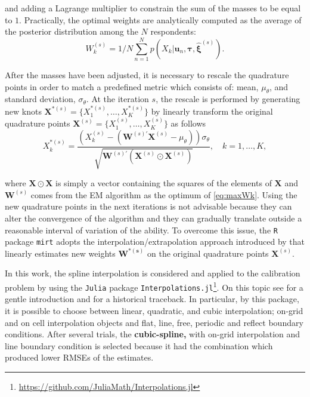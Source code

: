 \noindent and adding a Lagrange multiplier to constrain the sum of the masses to be equal to $1$. 
Practically, the optimal weights are analytically computed as the average of the posterior distribution among the $N$ respondents: 
\begin{equation} \label{eq:updateWk}
W_k^{(s)}  = 1/N \sum_{n=1}^N{p(X_k|\mathbf{u}_n,\boldsymbol{\tau},\hat{\boldsymbol{\xi}}^{(s)})}.
\end{equation}

After the masses have been adjusted, it is necessary to rescale the quadrature points in order to match a predefined metric which consists of: mean, $\mu_\theta$, and standard deviation, $\sigma_\theta$. At the iteration $s$, the rescale is performed by generating new knots $\boldsymbol{X}^{*(s)}=\{X_1^{*(s)},\ldots,X_K^{*(s)}\}$ by linearly transform the original quadrature points $\boldsymbol{X}^{(s)}=\{X_1^{(s)},\ldots,X_K^{(s)}\}$ as follows
\begin{equation}\label{eq:rescale}
X_k^{*(s)}=\frac{(X_k^{(s)}-(\boldsymbol{W}^{(s)'}\boldsymbol{X}^{(s)}-\mu_\theta))\sigma_\theta}{\sqrt{\boldsymbol{W}^{(s)'}(\boldsymbol{X}^{(s)}\odot \boldsymbol{X}^{(s)})}}, \quad  k=1,\ldots,K,
\end{equation}

\noindent where $\boldsymbol{X} \odot \boldsymbol{X}$ is simply a vector containing the squares of the elements of $\boldsymbol{X}$ and $\boldsymbol{W}^{(s)}$ comes from the EM algorithm as the optimum of \eqref{eq:maxWk}.
Using the new quadrature points in the next iterations is not advisable because they can alter the convergence of the algorithm and they can gradually translate outside a reasonable interval of variation of the ability. To overcome this issue, the \texttt{R} package \texttt{mirt} adopts the interpolation/extrapolation approach introduced by \textcite{woods2007} that linearly estimates new weights $\boldsymbol{W^{*(s)}}$ on the original quadrature points $\boldsymbol{X}^{(s)}$. 

In this work, the spline interpolation is considered and applied to the calibration problem by using the \texttt{Julia} package \texttt{Interpolations.jl}\footnote{\url{https://github.com/JuliaMath/Interpolations.jl}}. On this topic see \textcite{de1978practical} for a gentle introduction and \textcite{meijering2002chronology} for a historical traceback. 
In particular, by this package, it is possible to choose between linear, quadratic, and cubic interpolation; on-grid and on cell interpolation objects and flat, line, free, periodic and reflect boundary conditions. After several trials, the \textbf{cubic-spline,} with on-grid interpolation and line boundary condition is selected because it had the combination which produced lower RMSEs of the estimates.


